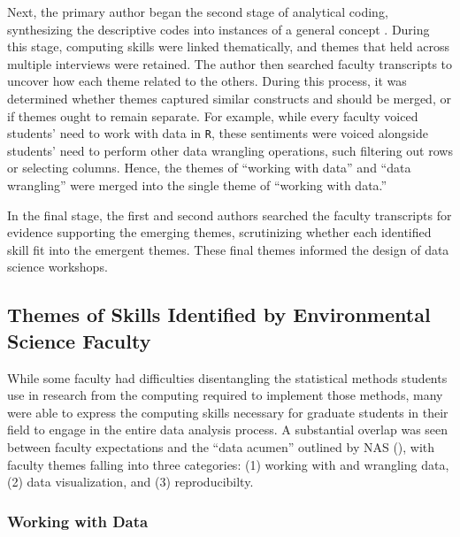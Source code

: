 \documentclass[12pt]{article}
\begin{document}
\quad Next, the primary author began the second stage of analytical coding,
synthesizing the descriptive codes into instances of a general concept 
\citep[p.\ 95]{miles}. During this stage, computing skills were linked
thematically, and themes that held across multiple interviews were retained.
The author then searched faculty transcripts to uncover how each theme related
to the others. During this process, it was determined whether themes captured
similar constructs and should be merged, or if themes ought to remain separate. 
For example, while every faculty voiced students' need to work with data in 
\texttt{R}, these sentiments were voiced alongside students' need to perform
other data wrangling operations, such filtering out rows or selecting columns. 
Hence, the themes of ``working with data'' and ``data wrangling'' were merged
into the single theme of ``working with data.'' 


\quad In the final stage, the first and second authors searched the faculty
transcripts for evidence supporting the emerging themes, scrutinizing whether
each identified skill fit into the emergent themes. 
These final themes informed the design of data science workshops. 

\subsection{Themes of Skills Identified by Environmental Science Faculty}

\noindent While some faculty had difficulties disentangling the statistical
methods students use in research from the computing required to implement those
methods, many were able to express the computing skills necessary for graduate
students in their field to engage in the entire data analysis process. A
substantial overlap was seen between faculty expectations and the ``data
acumen'' outlined by NAS (\citeyear{nas}), with faculty themes falling into
three categories: (1) working with and wrangling data, (2) data visualization,
and (3) reproducibilty. 

\subsubsection{Working with Data}  
\end{document}
